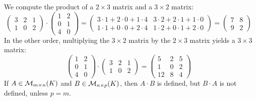 \begin{example}
We compute the product of a $2 \times 3$ matrix and a $3 \times 2$ matrix:
\begin{equation*}
    \begin{pmatrix} 3 & 2 & 1 \\ 1 & 0 & 2 \end{pmatrix} \cdot \begin{pmatrix} 1 & 2 \\ 0 & 1 \\ 4 & 0 \end{pmatrix} = \begin{pmatrix} 3 \cdot 1 + 2 \cdot 0 + 1 \cdot 4 & 3 \cdot 2 + 2 \cdot 1 + 1 \cdot 0 \\ 1 \cdot 1 + 0 \cdot 0 + 2 \cdot 4 & 1 \cdot 2 + 0 \cdot 1 + 2 \cdot 0 \end{pmatrix} = \begin{pmatrix} 7 & 8 \\ 9 & 2 \end{pmatrix}
\end{equation*}
In the other order, multiplying the $3 \times 2$ matrix by the $2 \times 3$ matrix yields a $3 \times 3$ matrix:
\begin{equation*}
    \begin{pmatrix} 1 & 2 \\ 0 & 1 \\ 4 & 0 \end{pmatrix} \cdot \begin{pmatrix} 3 & 2 & 1 \\ 1 & 0 & 2 \end{pmatrix} = \begin{pmatrix} 5 & 2 & 5 \\ 1 & 0 & 2 \\ 12 & 8 & 4 \end{pmatrix}
\end{equation*}
If $A \in \mathcal{M}_{m \times n}(K)$ and $B \in \mathcal{M}_{n \times p}(K)$, then $A \cdot B$ is defined, but $B \cdot A$ is not defined, unless $p = m$.
\end{example}

